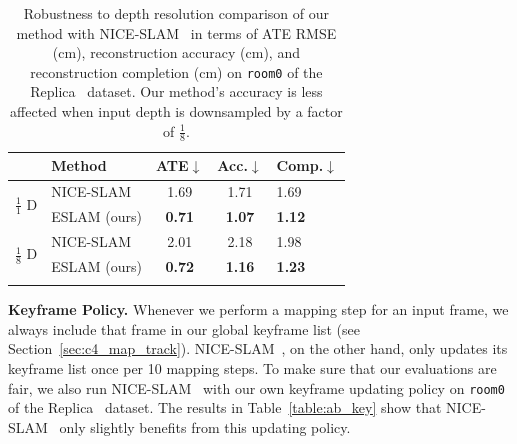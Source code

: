 \begin{table}[t]
    \begin{center}
        \begin{tabular}{l|l|ccl}
            \Xhline{2\arrayrulewidth}
            & Method & ATE$\downarrow$ & Acc.$\downarrow$ & Comp.$\downarrow$ \\
            
            \hline
            \multirow{2}{*}{$\frac{1}{1}$ D}
            & NICE-SLAM~\citep{zhu2022nice} & 1.69 & 1.71 & 1.69 \\
            & ESLAM (ours) & \textbf{0.71} & \textbf{1.07} & \textbf{1.12} \\

            \hline
            \multirow{2}{*}{$\frac{1}{8}$ D} & NICE-SLAM~\citep{zhu2022nice} & 2.01 & 2.18 & 1.98 \\
            & ESLAM (ours) & \textbf{0.72} & \textbf{1.16} & \textbf{1.23} \\
            
            \Xhline{2\arrayrulewidth}
        \end{tabular}
    \end{center}
    \caption{Robustness to depth resolution comparison of our method with NICE-SLAM~\citep{zhu2022nice} in terms of ATE RMSE (cm), reconstruction accuracy (cm), and reconstruction completion (cm) on \texttt{room0} of the Replica~\citep{replica19arxiv} dataset. Our method's accuracy is less affected when input depth is downsampled by a factor of $\frac{1}{8}$.}
    \label{table:ab_depth}
\end{table}

\vspace{1ex}
\noindent\textbf{Keyframe Policy.} Whenever we perform a mapping step for an input frame, we always include that frame in our global keyframe list (see Section~\ref{sec:c4_map_track}). NICE-SLAM~\citep{zhu2022nice}, on the other hand, only updates its keyframe list once per 10 mapping steps. To make sure that our evaluations are fair, we also run NICE-SLAM~\citep{zhu2022nice} with our own keyframe updating policy on \texttt{room0} of the Replica~\citep{replica19arxiv} dataset. The results in Table~\ref{table:ab_key} show that NICE-SLAM~\citep{zhu2022nice} only slightly benefits from this updating policy.

